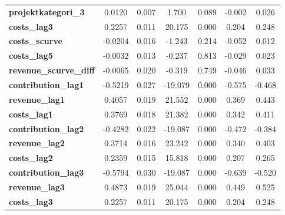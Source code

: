 \begin{center}
\begin{tabular}{lcccccc}
\textbf{projektkategori\_3}               &       0.0120  &        0.007     &     1.700  &         0.089        &       -0.002    &        0.026     \\
\textbf{costs\_lag3}                      &       0.2257  &        0.011     &    20.175  &         0.000        &        0.204    &        0.248     \\
\textbf{costs\_scurve}                    &      -0.0204  &        0.016     &    -1.243  &         0.214        &       -0.052    &        0.012     \\
\textbf{costs\_lag5}                      &      -0.0032  &        0.013     &    -0.237  &         0.813        &       -0.029    &        0.023     \\
\textbf{revenue\_scurve\_diff}            &      -0.0065  &        0.020     &    -0.319  &         0.749        &       -0.046    &        0.033     \\
\textbf{contribution\_lag1}               &      -0.5219  &        0.027     &   -19.079  &         0.000        &       -0.575    &       -0.468     \\
\textbf{revenue\_lag1}                    &       0.4057  &        0.019     &    21.552  &         0.000        &        0.369    &        0.443     \\
\textbf{costs\_lag1}                      &       0.3769  &        0.018     &    21.382  &         0.000        &        0.342    &        0.411     \\
\textbf{contribution\_lag2}               &      -0.4282  &        0.022     &   -19.087  &         0.000        &       -0.472    &       -0.384     \\
\textbf{revenue\_lag2}                    &       0.3714  &        0.016     &    23.242  &         0.000        &        0.340    &        0.403     \\
\textbf{costs\_lag2}                      &       0.2359  &        0.015     &    15.818  &         0.000        &        0.207    &        0.265     \\
\textbf{contribution\_lag3}               &      -0.5794  &        0.030     &   -19.087  &         0.000        &       -0.639    &       -0.520     \\
\textbf{revenue\_lag3}                    &       0.4873  &        0.019     &    25.044  &         0.000        &        0.449    &        0.525     \\
\textbf{costs\_lag3}                      &       0.2257  &        0.011     &    20.175  &         0.000        &        0.204    &        0.248     \\

\end{tabular}
\end{center}
